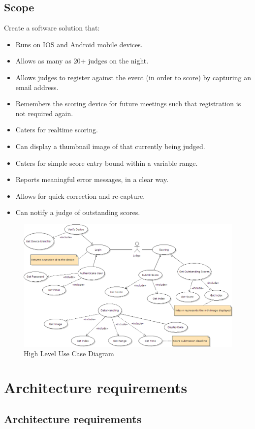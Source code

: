 \documentclass[10pt,a4paper]{article}
\begin{document}
\subsection{Scope}
Create a software solution that:
\begin{itemize}
\item Runs on IOS and Android mobile devices.
\item Allows as many as 20+ judges on the night.
\item Allows judges to register against the event (in order to score) by capturing an email address.
\item Remembers the scoring device for future meetings such that registration is not required again.
\item Caters for realtime scoring.
\item Can display a thumbnail image of that currently being judged.
\item Caters for simple score entry bound within a variable range.
\item Reports meaningful error messages, in a clear way.
\item Allows for quick correction and re-capture.
\item Can notify a judge of outstanding scores.
\end{itemize}

\begin{figure}  
\includegraphics[scale=0.4]{Pictures/High-level-use-case.png}
\caption[Long caption]{High Level Use Case Diagram}
\label{pic-a}
\end{figure}
\pagebreak
\section{Architecture requirements}
\subsection{Architecture requirements}
\end{document}
